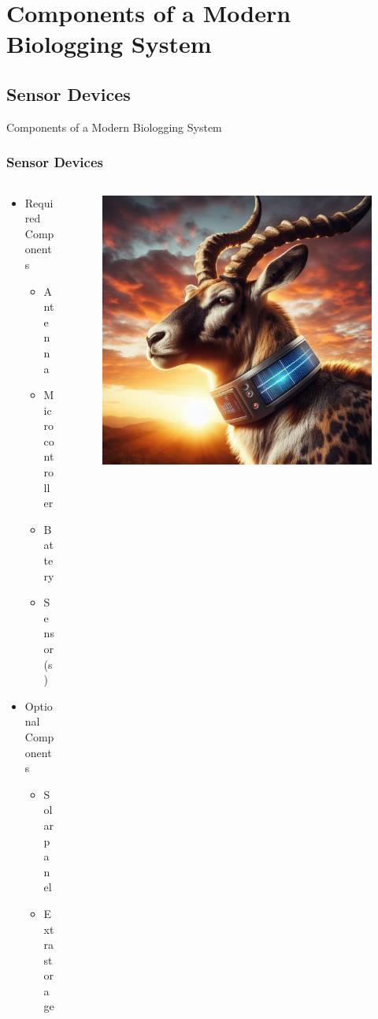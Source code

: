 \documentclass{beamer}
\begin{document}
\section{Components of a Modern Biologging System}

\subsection{Sensor Devices}

  \begin{frame}{Components of a Modern Biologging System}
    \frametitle{Sensor Devices}
    \begin{columns}
      \begin{column}{.5\textwidth}
        \begin{itemize}
          \item Required Components
          \begin{itemize}
            \item Antenna
            \item Microcontroller
            \item Battery
            \item Sensor(s)
          \end{itemize}
          \item Optional Components
          \begin{itemize}
            \item Solar panel
            \item Extra storage
          \end{itemize}
        \end{itemize}
      \end{column}
      \begin{column}{0.5\textwidth}
        \begin{figure}[htbp]
          \centering
          \includegraphics[height=.6\textheight]{Solar_collar.jpg}

\end{figure}
\end{column}
\end{columns}
\end{frame}
\end{document}
